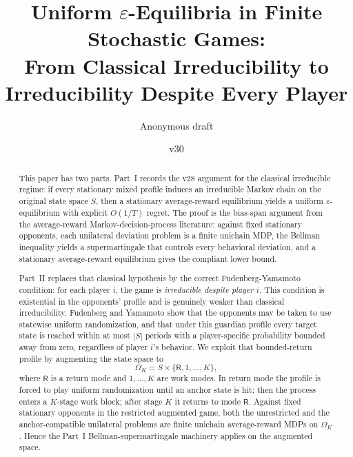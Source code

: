 \documentclass[11pt]{article}
\title{Uniform $\varepsilon$-Equilibria in Finite Stochastic Games:\\
From Classical Irreducibility to Irreducibility Despite Every Player}
\author{Anonymous draft}
\date{v30}
\theoremstyle{definition}
\newcommand{\1}{\mathbf{1}}
\begin{document}
\maketitle

\begin{abstract}
This paper has two parts. Part~I records the v28 argument for the classical irreducible regime: if every stationary mixed profile induces an irreducible Markov chain on the original state space $S$, then a stationary average-reward equilibrium yields a uniform $\varepsilon$-equilibrium with explicit $O(1/T)$ regret. The proof is the bias-span argument from the average-reward Markov-decision-process literature: against fixed stationary opponents, each unilateral deviation problem is a finite unichain MDP, the Bellman inequality yields a supermartingale that controls every behavioral deviation, and a stationary average-reward equilibrium gives the compliant lower bound.

Part~II replaces that classical hypothesis by the correct Fudenberg-Yamamoto condition: for each player $i$, the game is \emph{irreducible despite player $i$}. This condition is existential in the opponents' profile and is genuinely weaker than classical irreducibility. Fudenberg and Yamamoto \cite{FudenbergYamamoto2011} show that the opponents may be taken to use statewise uniform randomization, and that under this guardian profile every target state is reached within at most $|S|$ periods with a player-specific probability bounded away from zero, regardless of player $i$'s behavior. We exploit that bounded-return profile by augmenting the state space to
\[
\Omega_K=S\times\{\mathsf R,1,\dots,K\},
\]
where $\mathsf R$ is a return mode and $1,\dots,K$ are work modes. In return mode the profile is forced to play uniform randomization until an anchor state is hit; then the process enters a $K$-stage work block; after stage $K$ it returns to mode $\mathsf R$. Against fixed stationary opponents in the restricted augmented game, both the unrestricted and the anchor-compatible unilateral problems are finite unichain average-reward MDPs on $\Omega_K$. Hence the Part~I Bellman-supermartingale machinery applies on the augmented space.


\end{abstract}
\end{document}
